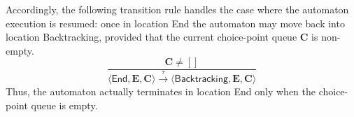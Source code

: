 \documentclass{article}
\newcommand{\stateStyle}[1]{\textsf{#1}}
\newcommand{\state}[1]{\stateStyle{#1}}
\newcommand{\vect}[1]{\mathbf{#1}}
\newcommand{\transition}[1]{\xrightarrow{\ #1\ }}
\begin{document}
Accordingly, the following transition rule handles the case where the automaton execution is resumed: once in location \state{End} the automaton may move back into location \state{Backtracking}, provided that the current choice-point queue $\vect{C}$ is non-empty.
%
\[
    \frac{
        \vect{C} \neq []
    }{
        \langle \state{End}, \vect{E}, \vect{C} \rangle
        \transition{\tau}
        \langle \state{Backtracking}, \vect{E}, \vect{C} \rangle
    }
\]
%
Thus, the automaton actually terminates in location \state{End} only when the choice-point queue is empty.
\end{document}
